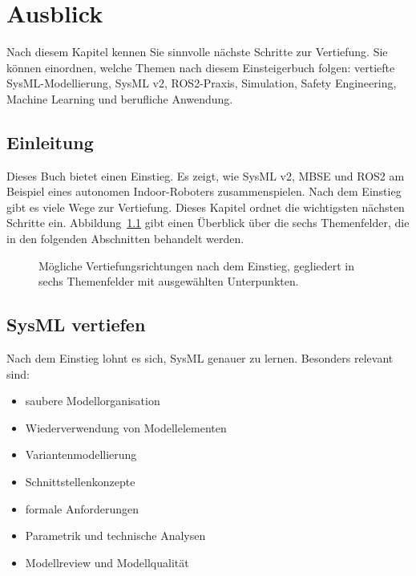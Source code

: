 \chapter{Ausblick}

\begin{lernziele}
Nach diesem Kapitel kennen Sie sinnvolle nächste Schritte zur Vertiefung. Sie können einordnen, welche Themen nach diesem Einsteigerbuch folgen: vertiefte SysML-Modellierung, SysML v2, ROS2-Praxis, Simulation, Safety Engineering, Machine Learning und berufliche Anwendung.
\end{lernziele}

\section{Einleitung}
Dieses Buch bietet einen Einstieg. Es zeigt, wie SysML v2, MBSE und ROS2 am Beispiel eines autonomen Indoor-Roboters zusammenspielen. Nach dem Einstieg gibt es viele Wege zur Vertiefung. Dieses Kapitel ordnet die wichtigsten nächsten Schritte ein. Abbildung~\ref{fig:kap22-vertiefungs-roadmap} gibt einen Überblick über die sechs Themenfelder, die in den folgenden Abschnitten behandelt werden.

\begin{figure}[H]
  \centering
  \caption{Mögliche Vertiefungsrichtungen nach dem Einstieg, gegliedert in sechs Themenfelder mit ausgewählten Unterpunkten.}
  \label{fig:kap22-vertiefungs-roadmap}
\end{figure}

\section{SysML vertiefen}
Nach dem Einstieg lohnt es sich, SysML genauer zu lernen. Besonders relevant sind:

\begin{itemize}
    \item saubere Modellorganisation
    \item Wiederverwendung von Modellelementen
    \item Variantenmodellierung
    \item Schnittstellenkonzepte
    \item formale Anforderungen
    \item Parametrik und technische Analysen
    \item Modellreview und Modellqualität
\end{itemize}

